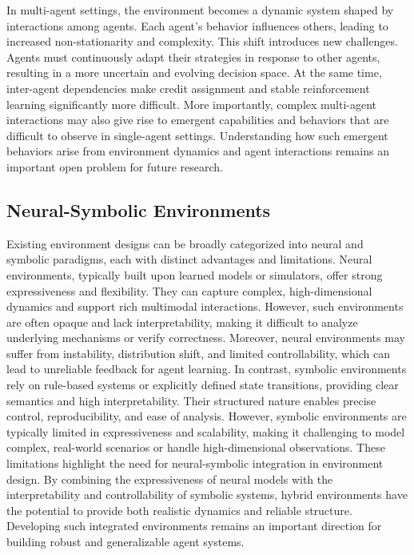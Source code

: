 \documentclass{llmxive}
\begin{document}
In multi-agent settings, the environment becomes a dynamic system shaped by interactions among agents. Each agent’s behavior influences others, leading to increased non-stationarity and complexity.
This shift introduces new challenges. Agents must continuously adapt their strategies in response to other agents, resulting in a more uncertain and evolving decision space. At the same time, inter-agent dependencies make credit assignment and stable reinforcement learning significantly more difficult. 
More importantly, complex multi-agent interactions may also give rise to emergent capabilities and behaviors that are difficult to observe in single-agent settings.
Understanding how such emergent behaviors arise from environment dynamics and agent interactions remains an important open problem for future research.




\subsection{Neural-Symbolic Environments}

Existing environment designs can be broadly categorized into neural and symbolic paradigms, each with distinct advantages and limitations.
Neural environments, typically built upon learned models or simulators, offer strong expressiveness and flexibility. They can capture complex, high-dimensional dynamics and support rich multimodal interactions. However, such environments are often opaque and lack interpretability, making it difficult to analyze underlying mechanisms or verify correctness. Moreover, neural environments may suffer from instability, distribution shift, and limited controllability, which can lead to unreliable feedback for agent learning.
In contrast, symbolic environments rely on rule-based systems or explicitly defined state transitions, providing clear semantics and high interpretability. Their structured nature enables precise control, reproducibility, and ease of analysis. However, symbolic environments are typically limited in expressiveness and scalability, making it challenging to model complex, real-world scenarios or handle high-dimensional observations.
These limitations highlight the need for neural-symbolic integration in environment design. By combining the expressiveness of neural models with the interpretability and controllability of symbolic systems, hybrid environments have the potential to provide both realistic dynamics and reliable structure. Developing such integrated environments remains an important direction for building robust and generalizable agent systems.
\end{document}
